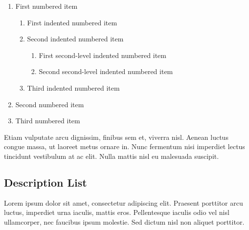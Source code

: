 \documentclass[
	a4paper, %
	12pt, %
]{include/CSSullivanBusinessReport}
\begin{document}
\begin{enumerate}
	\item First numbered item
	\begin{enumerate}
		\item First indented numbered item
		\item Second indented numbered item
		\begin{enumerate}
			\item First second-level indented numbered item
			\item Second second-level indented numbered item
		\end{enumerate}
		\item Third indented numbered item
	\end{enumerate}
	\item Second numbered item
	\item Third numbered item
\end{enumerate}

Etiam vulputate arcu dignissim, finibus sem et, viverra nisl. Aenean luctus congue massa, ut laoreet metus ornare in. Nunc fermentum nisi imperdiet lectus tincidunt vestibulum at ac elit. Nulla mattis nisl eu malesuada suscipit.


\subsection{Description List}

Lorem ipsum dolor sit amet, consectetur adipiscing elit. Praesent porttitor arcu luctus, imperdiet urna iaculis, mattis eros. Pellentesque iaculis odio vel nisl ullamcorper, nec faucibus ipsum molestie. Sed dictum nisl non aliquet porttitor.
\end{document}
